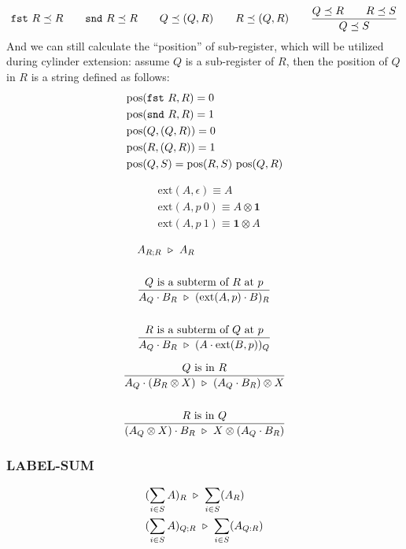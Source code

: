 \begin{definition}
  \begin{gather*}
    \texttt{fst}\ R \preceq R \qquad \texttt{snd}\ R \preceq R \qquad Q \preceq (Q, R) \qquad R \preceq (Q, R)
    \qquad 
    \frac{Q \preceq R \qquad R \preceq S}{Q \preceq S}
  \end{gather*}
  And we can still calculate the ``position'' of sub-register, which will be utilized during cylinder extension: assume $Q$ is a sub-register of $R$, then the position of $Q$ in $R$ is a string defined as follows:
  \begin{align*}
    & \textrm{pos}(\texttt{fst}\ R, R) = 0 \\
    & \textrm{pos}(\texttt{snd}\ R, R) = 1 \\
    & \textrm{pos}(Q, (Q, R)) = 0 \\
    & \textrm{pos}(R, (Q, R)) = 1 \\
    & \textrm{pos}(Q, S) = \textrm{pos}(R, S)\ \textrm{pos}(Q, R)
  \end{align*}
\end{definition}


\begin{definition}
  \begin{align*}
    & \textrm{ext}(A, \epsilon) \equiv A \\
    & \textrm{ext}(A, p\ 0) \equiv A \otimes \mathbf{1} \\
    & \textrm{ext}(A, p\ 1) \equiv \mathbf{1} \otimes A
  \end{align*}
\end{definition}

\begin{align*}
  & A_{R; R} \ \triangleright\  A_{R} \\
  \\
  & \frac{Q \textrm{ is a subterm of } R \textrm{ at } p}{A_{Q} \cdot B_{R} \ \triangleright\  (\textrm{ext}(A, p) \cdot B)_{R}} \\
  \\
  & \frac{R \textrm{ is a subterm of } Q \textrm{ at } p}{A_{Q} \cdot B_{R} \ \triangleright\  (A \cdot \textrm{ext}(B, p))_{Q}} \\
\end{align*}

\begin{align*}
  & \frac{Q \textrm{ is in } R}{A_{Q} \cdot (B_{R} \otimes X) \ \triangleright\  (A_{Q} \cdot B_{R}) \otimes X} \\
  \\
  & \frac{R \textrm{ is in } Q}{(A_{Q} \otimes X) \cdot B_{R} \ \triangleright\  X \otimes (A_{Q} \cdot B_{R})} \\
\end{align*}

\subsubsection*{\textsf{LABEL-SUM}}
\begin{align*}
  & (\sum_{i \in S} A)_{R} \ \triangleright\  \sum_{i \in S} (A_{R}) \\
  & (\sum_{i \in S} A)_{Q; R} \ \triangleright\  \sum_{i \in S} (A_{Q: R}) \\
\end{align*}
